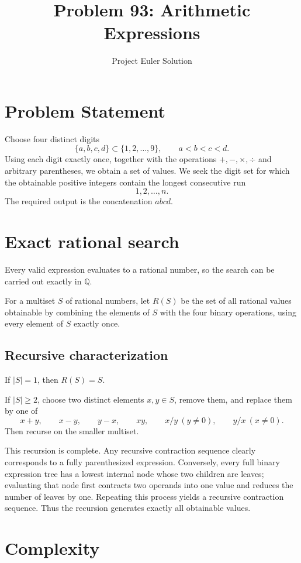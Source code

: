 \documentclass[12pt]{article}
\title{Problem 93: Arithmetic Expressions}
\author{Project Euler Solution}
\date{}
\begin{document}
\maketitle

\section{Problem Statement}

Choose four distinct digits
\[
\{a,b,c,d\}\subset\{1,2,\dots,9\},\qquad a<b<c<d.
\]
Using each digit exactly once, together with the operations $+,-,\times,\div$ and arbitrary parentheses, we obtain a set of values. We seek the digit set for which the obtainable positive integers contain the longest consecutive run
\[
1,2,\dots,n.
\]
The required output is the concatenation $abcd$.

\section{Exact rational search}

Every valid expression evaluates to a rational number, so the search can be carried out exactly in $\mathbb{Q}$.

For a multiset $S$ of rational numbers, let $R(S)$ be the set of all rational values obtainable by combining the elements of $S$ with the four binary operations, using every element of $S$ exactly once.

\subsection*{Recursive characterization}

If $|S|=1$, then $R(S)=S$.

If $|S|\ge 2$, choose two distinct elements $x,y\in S$, remove them, and replace them by one of
\[
x+y,\qquad x-y,\qquad y-x,\qquad xy,\qquad x/y\ (y\ne 0),\qquad y/x\ (x\ne 0).
\]
Then recurse on the smaller multiset.

This recursion is complete. Any recursive contraction sequence clearly corresponds to a fully parenthesized expression. Conversely, every full binary expression tree has a lowest internal node whose two children are leaves; evaluating that node first contracts two operands into one value and reduces the number of leaves by one. Repeating this process yields a recursive contraction sequence. Thus the recursion generates exactly all obtainable values.

\section{Complexity}
\end{document}
